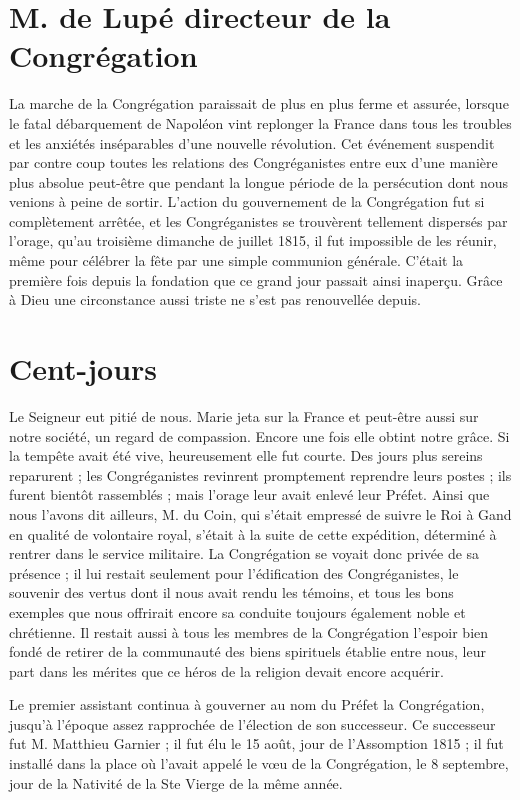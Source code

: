 \section*{M. de Lupé directeur de la Congrégation}
La marche de la Congrégation paraissait de plus en plus ferme et assurée, lorsque le fatal débarquement de Napoléon vint replonger la France dans tous les troubles et les anxiétés inséparables d'une nouvelle révolution. Cet événement suspendit par contre coup toutes les relations des Congréganistes entre eux d'une manière plus absolue peut-être que pendant la longue période de la persécution dont nous venions à peine de sortir. L'action du gouvernement de la Congrégation fut si complètement arrêtée, et les Congréganistes se trouvèrent tellement dispersés par l'orage, qu'au troisième dimanche de
juillet 1815, il fut impossible de les réunir, même pour célébrer la fête par une simple communion générale. C'était la première fois depuis la fondation que ce grand jour passait ainsi inaperçu. Grâce à Dieu une circonstance aussi triste ne s'est pas renouvellée depuis.

\section*{Cent-jours}
Le Seigneur eut pitié de nous. Marie jeta sur la France et peut-être aussi sur notre société, un regard de compassion. Encore une fois elle obtint notre grâce. Si la tempête avait été vive, heureusement elle fut courte. Des jours plus sereins reparurent ; les Congréganistes revinrent promptement reprendre leurs postes ; ils furent bientôt rassemblés ; mais l’orage leur avait enlevé leur Préfet. Ainsi que nous l'avons dit ailleurs, M. du Coin, qui s'était empressé de suivre le Roi à Gand en qualité de volontaire royal, s'était à la suite de cette expédition, déterminé à rentrer dans le service militaire. La Congrégation se voyait donc privée de sa présence ; il lui restait seulement pour l'édification des Congréganistes, le souvenir des vertus dont il nous avait rendu les témoins, et tous les bons exemples que nous offrirait encore sa conduite toujours également noble et chrétienne. Il restait aussi à tous les membres de la Congrégation l'espoir bien fondé de retirer de la communauté des biens spirituels établie entre nous, leur part dans les mérites que ce héros de la religion devait encore acquérir.

Le premier assistant continua à gouverner au nom du Préfet la Congrégation, jusqu'à l'époque assez rapprochée de l'élection de son successeur. Ce successeur fut M. Matthieu Garnier ; il fut élu le 15 août, jour de l'Assomption 1815 ; il fut installé dans la place où l'avait appelé le vœu de la
Congrégation, le 8 septembre, jour de la Nativité de la Ste Vierge de la même année.
